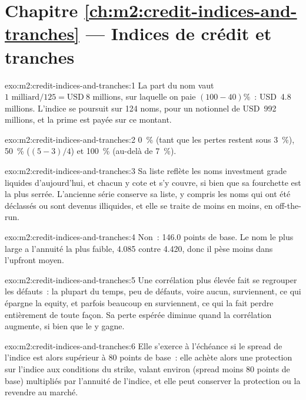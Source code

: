 \section*{Chapitre \ref{ch:m2:credit-indices-and-tranches} --- Indices de crédit et tranches}

\begin{solution}{exo:m2:credit-indices-and-tranches:1}
La part du nom vaut $1\text{ milliard}/125 = \text{USD}~8$ millions, sur laquelle on paie
$(100 - 40)\% $~: USD~4.8 millions. L'indice se poursuit sur 124 noms, pour un notionnel de
USD~992 millions, et la prime est payée sur ce montant.
\end{solution}

\begin{solution}{exo:m2:credit-indices-and-tranches:2}
0~\% (tant que les pertes restent sous 3~\%), 50~\% ($(5-3)/4$) et 100~\% (au-delà de 7~\%).
\end{solution}

\begin{solution}{exo:m2:credit-indices-and-tranches:3}
Sa liste reflète les noms investment grade liquides d'aujourd'hui, et chacun y cote et s'y
couvre, si bien que sa fourchette est la plus serrée. L'ancienne série conserve sa liste, y compris les noms
qui ont été déclassés ou sont devenus illiquides, et elle se traite de moins en moins, en off-the-run.
\end{solution}

\begin{solution}{exo:m2:credit-indices-and-tranches:4}
Non~: 146.0 points de base. Le nom le plus large a l'annuité la plus faible, 4.085 contre 4.420,
donc il pèse moins dans l'upfront moyen.
\end{solution}

\begin{solution}{exo:m2:credit-indices-and-tranches:5}
Une corrélation plus élevée fait se regrouper les défauts~: la plupart du temps, peu de défauts, voire aucun, surviennent, ce qui épargne la  equity, et
parfois beaucoup en surviennent, ce qui la fait perdre entièrement de toute façon. Sa perte espérée
diminue quand la corrélation augmente, si bien que le  y gagne.
\end{solution}

\begin{solution}{exo:m2:credit-indices-and-tranches:6}
Elle s'exerce à l'échéance si le spread de l'indice est alors supérieur à 80 points de base~: elle
achète alors une protection sur l'indice aux conditions du strike, valant environ (spread moins
80 points de base) multipliés par l'annuité de l'indice, et elle peut conserver la protection ou
la revendre au marché.
\end{solution}

